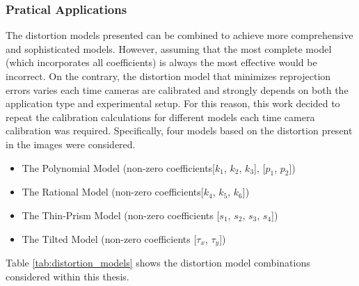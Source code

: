 \subsubsection{Pratical Applications}

The distortion models presented can be combined to achieve more comprehensive and sophisticated models. However, assuming that the most complete model (which incorporates all coefficients) is always the most effective would be incorrect. On the contrary, the distortion model that minimizes reprojection errors varies each time cameras are calibrated and strongly depends on both the application type and experimental setup.
For this reason, this work decided to repeat the calibration calculations for different models each time camera calibration was required. Specifically, four models based on the distortion present in the images were considered.

\begin{itemize}
  \item The Polynomial Model
  (non-zero coefficients[$k_1$, $k_2$, $k_3$], [$p_1$, $p_2$])
  \item The Rational Model
  (non-zero coefficients[$k_4$, $k_5$, $k_6$])
  \item The Thin-Prism Model
  (non-zero coefficients [$s_1$, $s_2$, $s_3$, $s_4$])
  \item The Tilted Model
  (non-zero coefficients [$\tau_x$, $\tau_y$])
\end{itemize}

Table \ref{tab:distortion_models} shows the distortion model combinations considered within this thesis.

\begin{table}[htbp]
  \centering
  \caption{Combinations of distortion models considered.}
  \label{tab:distortion_models}
\end{table}

